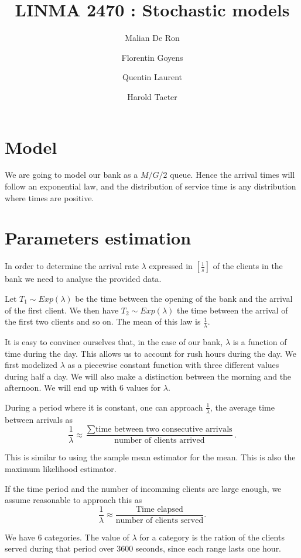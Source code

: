 \documentclass[12pt,a4paper,notitlepage]{report}
\title{LINMA 2470 : Stochastic models}
\author{
  \small
  Malian De Ron
  \and
   \small  
  Florentin Goyens
  \and
  \small
  Quentin Laurent
  \and
  \small
  Harold Taeter
}
\begin{document}
\maketitle
\section*{Model}
We are going to model our bank as a $M/G/2$ queue. Hence the arrival times will follow an exponential law, and the distribution of service time is any distribution where times are positive.
\section*{Parameters estimation}
In order to determine the arrival rate $\lambda$ expressed in $[\frac{1}{s}]$ of the clients in the bank we need to analyse the provided data.


Let $T_{1} \sim Exp(\lambda)$ be the time between the opening of the bank and the arrival of the first client. We then have $T_{2} \sim Exp(\lambda)$ the time between the arrival of the first two clients and so on. The mean of this law is $\frac{1}{\lambda}$. 

 It is easy to convince ourselves that, in the case of our bank, $\lambda$ is a function of time during the day. This allows us to account for rush hours during the day. We first modelized $\lambda$ as a piecewise constant function with three different values during half a day. We will also make a distinction between the morning and the afternoon. We will end up with $6$ values for $\lambda$.
 
 
During a period where it is constant, one can approach $\frac{1}{\lambda}$, the  average time between arrivals as
$$\frac{1}{\lambda}\approx \frac{\sum \text{time between two consecutive arrivals} }{ \text{number of clients arrived}}.$$  

This is similar to using the sample mean estimator for the mean. This is also the maximum likelihood estimator.

If the time period and the number of incomming clients are large enough, we assume reasonable to approach this as
$$\frac{1}{\lambda}\approx \frac{ \text{Time elapsed} }{ \text{number of clients served}}.$$

We have $6$ categories. The value of $\lambda$ for a category is the ration of the clients served during that period over $3600$ seconds, since each range lasts one hour.
\end{document}
